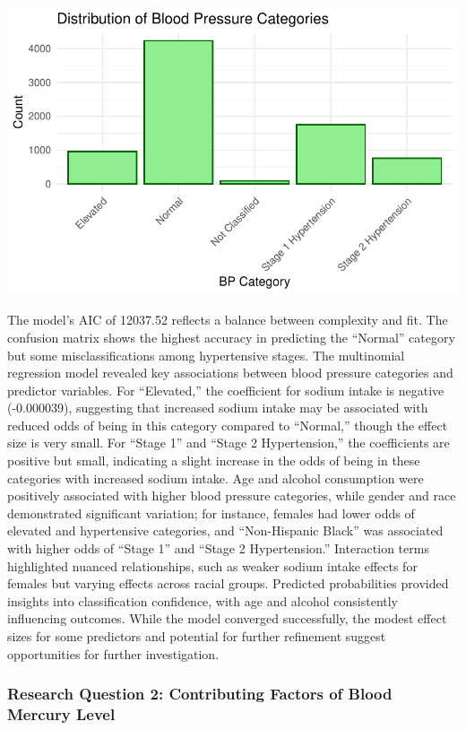 \documentclass[
  letterpaper,
  DIV=11,
  numbers=noendperiod]{scrartcl}
\begin{document}
\includegraphics{_IDS702_Final_Report_Feedback_files/figure-pdf/unnamed-chunk-6-2.pdf}

The model's AIC of 12037.52 reflects a balance between complexity and
fit. The confusion matrix shows the highest accuracy in predicting the
``Normal'' category but some misclassifications among hypertensive
stages. The multinomial regression model revealed key associations
between blood pressure categories and predictor variables. For
``Elevated,'' the coefficient for sodium intake is negative (-0.000039),
suggesting that increased sodium intake may be associated with reduced
odds of being in this category compared to ``Normal,'' though the effect
size is very small. For ``Stage 1'' and ``Stage 2 Hypertension,'' the
coefficients are positive but small, indicating a slight increase in the
odds of being in these categories with increased sodium intake. Age and
alcohol consumption were positively associated with higher blood
pressure categories, while gender and race demonstrated significant
variation; for instance, females had lower odds of elevated and
hypertensive categories, and ``Non-Hispanic Black'' was associated with
higher odds of ``Stage 1'' and ``Stage 2 Hypertension.'' Interaction
terms highlighted nuanced relationships, such as weaker sodium intake
effects for females but varying effects across racial groups. Predicted
probabilities provided insights into classification confidence, with age
and alcohol consistently influencing outcomes. While the model converged
successfully, the modest effect sizes for some predictors and potential
for further refinement suggest opportunities for further investigation.

\subsubsection{Research Question 2: Contributing Factors of Blood
Mercury
Level}\label{research-question-2-contributing-factors-of-blood-mercury-level}
\end{document}
